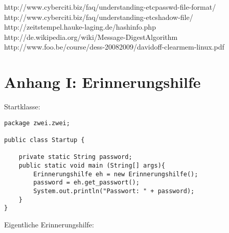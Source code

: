 \documentclass[twoside]{article}
\begin{document}
\begin{thebibliography}{1}
 http://www.cyberciti.biz/faq/understanding-etcpasswd-file-format/
 http://www.cyberciti.biz/faq/understanding-etcshadow-file/
 http://zeitstempel.hauke-laging.de/hashinfo.php
 http://de.wikipedia.org/wiki/Message-Digest\textunderscore Algorithm
 http://www.foo.be/course/dess-20082009/davidoff-clearmem-linux.pdf
\end{thebibliography}

\newpage
\section*{Anhang I: Erinnerungshilfe}
\label{gen}
Startklasse:
\begin{lstlisting}
package zwei.zwei;

public class Startup {

    private static String password;
    public static void main (String[] args){
        Erinnerungshilfe eh = new Erinnerungshilfe();
        password = eh.get_passwort();
        System.out.println("Passwort: " + password);
    }
}
\end{lstlisting}
Eigentliche Erinnerungshilfe:
\end{document}
